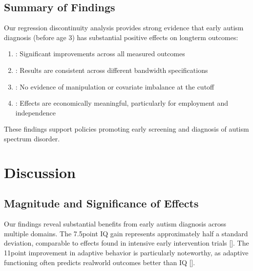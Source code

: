 \documentclass[letterpaper,10pt,english]{jupyterBook}
\begin{document}
\section{Summary of Findings}
\label{\detokenize{results:summary-of-findings}}
\sphinxAtStartPar
Our regression discontinuity analysis provides strong evidence that early autism diagnosis (before age 3) has substantial positive effects on long\sphinxhyphen{}term outcomes:
\begin{enumerate}
%
\item {} 
\sphinxAtStartPar
{}: Significant improvements across all measured outcomes

\item {} 
\sphinxAtStartPar
{}: Results are consistent across different bandwidth specifications

\item {} 
\sphinxAtStartPar
{}: No evidence of manipulation or covariate imbalance at the cutoff

\item {} 
\sphinxAtStartPar
{}: Effects are economically meaningful, particularly for employment and independence

\end{enumerate}

\sphinxAtStartPar
These findings support policies promoting early screening and diagnosis of autism spectrum disorder.

\sphinxstepscope


\chapter{Discussion}
\label{\detokenize{discussion:discussion}}\label{\detokenize{discussion::doc}}

\section{Magnitude and Significance of Effects}
\label{\detokenize{discussion:magnitude-and-significance-of-effects}}
\sphinxAtStartPar
Our findings reveal substantial benefits from early autism diagnosis across multiple domains. The 7.5\sphinxhyphen{}point IQ gain represents approximately half a standard deviation, comparable to effects found in intensive early intervention trials {[}{]}. The 11\sphinxhyphen{}point improvement in adaptive behavior is particularly noteworthy, as adaptive functioning often predicts real\sphinxhyphen{}world outcomes better than IQ {[}{]}.
\end{document}
